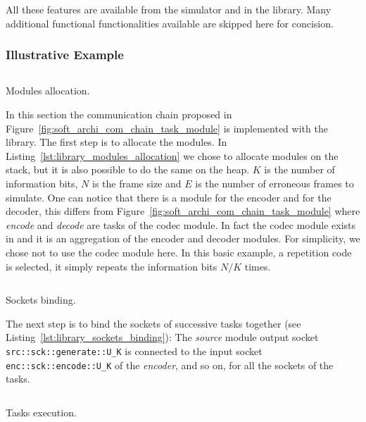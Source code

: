All these features are available from the simulator and in the library. Many
additional functional functionalities available are skipped here for concision.

\subsubsection{Illustrative Example}

\begin{listing}
  \inputminted[frame=lines,linenos]{C++}{main/chapter4/src/library/modules_allocation.cpp}
  \caption{Modules allocation.}
  \label{lst:library_modules_allocation}
\end{listing}

In this section the communication chain proposed in
Figure~\ref{fig:soft_archi_com_chain_task_module} is implemented with the
\AFFECT library. The first step is to allocate the modules. In
Listing~\ref{lst:library_modules_allocation} we chose to allocate modules on
the stack, but it is also possible to do the same on the heap. $K$ is the number
of information bits, $N$ is the frame size and $E$ is the number of erroneous
frames to simulate. One can notice that there is a module for the encoder and
for the decoder, this differs from
Figure~\ref{fig:soft_archi_com_chain_task_module} where \textit{encode} and
\textit{decode} are tasks of the codec module. In fact the codec module exists
in \AFFECT and it is an aggregation of the encoder and decoder modules. For
simplicity, we chose not to use the codec module here. In this basic example, a
repetition code is selected, it simply repeats the information bits $N/K$ times.

\begin{listing}
  \inputminted[frame=lines,linenos]{C++}{main/chapter4/src/library/sockets_binding.cpp}
  \caption{Sockets binding.}
  \label{lst:library_sockets_binding}
\end{listing}

The next step is to bind the sockets of successive tasks together (see
Listing~\ref{lst:library_sockets_binding}): The \textit{source} module
output socket \verb|src::sck::generate::U_K| is connected to the
input socket \verb|enc::sck::encode::U_K| of the \textit{encoder}, and so
on, for all the sockets of the tasks.

\begin{listing}
  \inputminted[frame=lines,linenos]{C++}{main/chapter4/src/library/tasks_execution.cpp}
  \caption{Tasks execution.}
  \label{lst:library_tasks_execution}
\end{listing}

